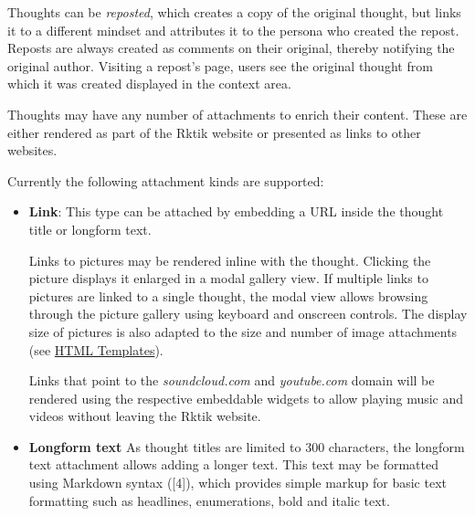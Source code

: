 Thoughts can be \emph{reposted}, which creates a copy of the original
thought, but links it to a different mindset and attributes it to the
persona who created the repost. Reposts are always created as comments
on their original, thereby notifying the original author. Visiting a
repost's page, users see the original thought from which it was created
displayed in the context area.


Thoughts may have any number of attachments to enrich their content.
These are either rendered as part of the Rktik website or presented as
links to other websites.

Currently the following attachment kinds are supported:

\begin{itemize}
\item
  \textbf{Link}: This type can be attached by embedding a URL inside the
  thought title or longform text.

  Links to pictures may be rendered inline with the thought. Clicking
  the picture displays it enlarged in a modal gallery view. If multiple
  links to pictures are linked to a single thought, the modal view
  allows browsing through the picture gallery using keyboard and
  onscreen controls. The display size of pictures is also adapted to the
  size and number of image attachments (see
  \hyperref[html-templates]{HTML Templates}).

  Links that point to the \emph{soundcloud.com} and \emph{youtube.com}
  domain will be rendered using the respective embeddable widgets to
  allow playing music and videos without leaving the Rktik website.
\item
  \textbf{Longform text} As thought titles are limited to 300
  characters, the longform text attachment allows adding a longer text.
  This text may be formatted using Markdown syntax ({[}4{]}), which
  provides simple markup for basic text formatting such as headlines,
  enumerations, bold and italic text.
\end{itemize}


